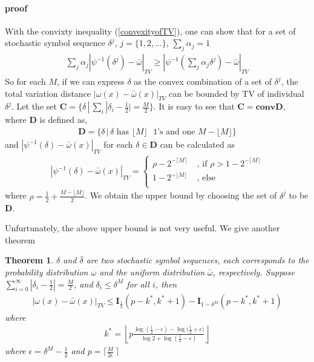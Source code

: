 \documentclass{article}
\newtheorem{theorem}{Theorem}
\begin{document}
\paragraph{proof}
With the convixty inequality (\ref{convexityofTV}), one can show that for a set of stochastic symbol sequence $\delta^j$, $j=\{1,2,...\}$, $\sum_j{\alpha_j} = 1$
\begin{eqnarray}
 \sum_j \alpha_j|\psi^{-1}(\delta^j)-\bar{\omega}|_{TV} \ge |\psi^{-1}(\sum_j \alpha_j \delta^j)-\bar{\omega}|_{TV}
\end{eqnarray}
So for each $M$, if we can express $\delta$ as the convex combination of a set of $\delta^j$, the total variation distance $|\omega(x)-\bar{\omega}(x)|_{TV}$ can be bounded by TV of individual $\delta^j$. Let the set $\mathbf{C} = \{\delta \, | \,\sum_i|\delta_i-\frac{1}{2}|  =  \frac{M}{2}\}$. It is easy to see that $\mathbf{C} = \mathbf{conv} \mathbf{D}$, where $\mathbf{D}$ is defined as, 
\begin{eqnarray}
  \mathbf{D}=\{\delta \, | \, \delta \text{ has } \lfloor M \rfloor \text{ } 1\text{'s and one } M-\lfloor M \rfloor   \}
\end{eqnarray}
and $|\psi^{-1}(\delta)-\bar{\omega}(x)|_{TV}$ for each $\delta \in  \mathbf{D}$ can be calculated as
\begin{eqnarray}
|\psi^{-1}(\delta)-\bar{\omega}(x)|_{TV} = \left\{ \begin{array}{cl}
                                   \rho - 2^{-\lceil M \rceil } &\text{ , if } \rho>1-2^{-\lceil M \rceil }\\
                                    1-2^{-\lfloor M \rfloor}    &\text{ , else}                                   \\
                                           \end{array} \right. 
\end{eqnarray}
where $\rho = \frac{1}{2} +  \frac{M-\lfloor M \rfloor}{2}$. We obtain the upper bound by choosing the set of $\delta^j$ to be $\mathbf{D}$. 

Unfurtunately, the above upper bound is not very useful. We give another theorem

\begin{theorem}
$\delta$ and $\bar{\delta}$ are two stochastic symbol sequences, each corresponds to the probability distribution $\omega$ and the uniform distribution $\bar{\omega}$, respectively. Suppose $\sum_{i=0}^\infty |\delta_i - \frac{1}{2}| = \frac{M}{2}$, and $\delta_i \le \delta^M$ for all $i$, then
\begin{eqnarray}
|\omega(x)-\bar{\omega}(x)|_{TV} \le  \mathbf{I}_{\frac{1}{2}}(p-k^*,k^*+1) - \mathbf{I}_{1-\delta^M}(p-k^*,k^*+1)
\end{eqnarray}
where  
\begin{eqnarray}
k^* =  \left\lfloor p \frac{\log{(\frac{1}{2}-\epsilon)}-\log{(\frac{1}{2}+\epsilon})}{\log{2}+\log{(\frac{1}{2}-\epsilon)} }  \right\rfloor
\end{eqnarray}
where $\epsilon = \delta^M - \frac{1}{2}$ and $p = \lceil \frac{M}{2\epsilon}\ \rceil$
\end{theorem}
\end{document}
